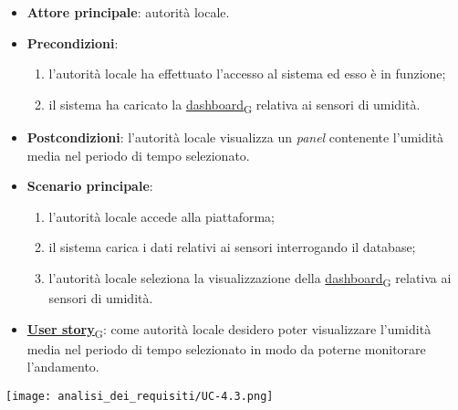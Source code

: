\begin{itemize}
	\item \textbf{Attore principale}: autorità locale.
	\item \textbf{Precondizioni}:
	      \begin{enumerate}
		      \item l'autorità locale ha effettuato l'accesso al sistema ed esso è in funzione;
		      \item il sistema ha caricato la \href{https://7last.github.io/docs/rtb/documentazione-interna/glossario\#dashboard}{dashboard\textsubscript{G}} relativa ai sensori di umidità.
	      \end{enumerate}
	\item \textbf{Postcondizioni}: l'autorità locale visualizza un \textit{panel} contenente l'umidità media nel periodo di tempo selezionato.
	\item \textbf{Scenario principale}:
	      \begin{enumerate}
		      \item l'autorità locale accede alla piattaforma;
		      \item il sistema carica i dati relativi ai sensori interrogando il database;
		      \item l'autorità locale seleziona la visualizzazione della \href{https://7last.github.io/docs/rtb/documentazione-interna/glossario\#dashboard}{dashboard\textsubscript{G}} relativa ai sensori di umidità.
	      \end{enumerate}
	\item \href{https://7last.github.io/docs/rtb/documentazione-interna/glossario\#user-story}{\textbf{User story}\textsubscript{G}}: come autorità locale desidero poter visualizzare l'umidità media nel periodo di tempo selezionato
	      in modo da poterne monitorare l'andamento.
\end{itemize}
\begin{center}
	\texttt{[image: analisi\_dei\_requisiti/UC-4.3.png]}
\end{center}

\newpage

